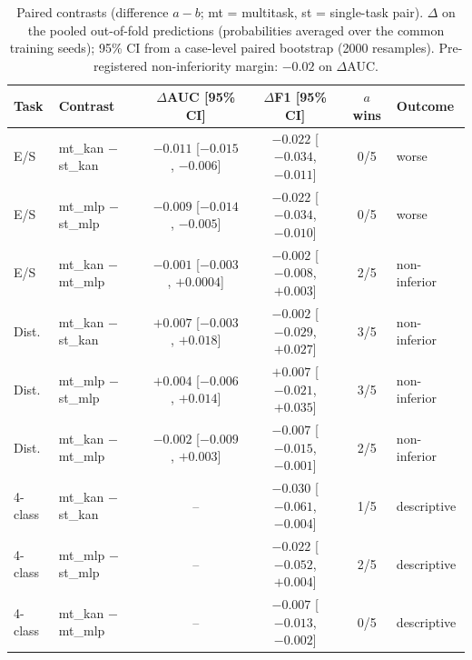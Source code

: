 \begin{table}[t]
\centering
\caption{Paired contrasts (difference $a - b$; mt = multitask, st = single-task pair). $\Delta$ on the pooled out-of-fold predictions (probabilities averaged over the common training seeds); 95\% CI from a case-level paired bootstrap (2000 resamples). Pre-registered non-inferiority margin: $-0.02$ on $\Delta$AUC.}
\label{tab:multitarefa_contrastes}
\scriptsize
\setlength{\tabcolsep}{3pt}
\begin{tabular}{llcccl}
\hline
Task & Contrast & $\Delta$AUC [95\% CI] & $\Delta$F1 [95\% CI] & $a$ wins & Outcome \\
\hline
E/S & mt\_kan $-$ st\_kan & $-0.011$ [$-0.015$, $-0.006$] & $-0.022$ [$-0.034$, $-0.011$] & 0/5 & worse \\
E/S & mt\_mlp $-$ st\_mlp & $-0.009$ [$-0.014$, $-0.005$] & $-0.022$ [$-0.034$, $-0.010$] & 0/5 & worse \\
E/S & mt\_kan $-$ mt\_mlp & $-0.001$ [$-0.003$, $+0.0004$] & $-0.002$ [$-0.008$, $+0.003$] & 2/5 & non-inferior \\
Dist. & mt\_kan $-$ st\_kan & $+0.007$ [$-0.003$, $+0.018$] & $-0.002$ [$-0.029$, $+0.027$] & 3/5 & non-inferior \\
Dist. & mt\_mlp $-$ st\_mlp & $+0.004$ [$-0.006$, $+0.014$] & $+0.007$ [$-0.021$, $+0.035$] & 3/5 & non-inferior \\
Dist. & mt\_kan $-$ mt\_mlp & $-0.002$ [$-0.009$, $+0.003$] & $-0.007$ [$-0.015$, $-0.001$] & 2/5 & non-inferior \\
4-class & mt\_kan $-$ st\_kan & -- & $-0.030$ [$-0.061$, $-0.004$] & 1/5 & descriptive \\
4-class & mt\_mlp $-$ st\_mlp & -- & $-0.022$ [$-0.052$, $+0.004$] & 2/5 & descriptive \\
4-class & mt\_kan $-$ mt\_mlp & -- & $-0.007$ [$-0.013$, $-0.002$] & 0/5 & descriptive \\
\hline
\end{tabular}
\end{table}
